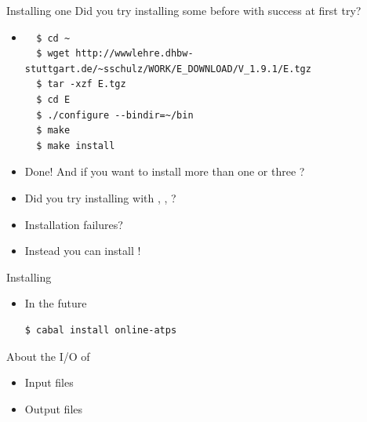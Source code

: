 \documentclass[newPxFont]{beamer}
\begin{document}
\begin{frame}[fragile]{Installing one \atp }
Did you try installing some \atp before with success at first try?\\
\begin{itemize}
\item {}
  \begin{lstlisting}
  $ cd ~
  $ wget http://wwwlehre.dhbw-stuttgart.de/~sschulz/WORK/E_DOWNLOAD/V_1.9.1/E.tgz
  $ tar -xzf E.tgz
  $ cd E
  $ ./configure --bindir=~/bin
  $ make
  $ make install
  \end{lstlisting}
\end{itemize}
\end{frame}

\begin{frame}
\begin{itemize}
\item Done! And if you want to install more than one or three \atps?\\
\item Did you try installing with \spass, \metis, \vampire?\\
\item Installation failures?
\item Instead you can install \onlineatps!
\end{itemize}
\end{frame}

\begin{frame}[fragile]{Installing \onlineatps}
\begin{itemize} \onlineatps
\begin{lstlisting}
$ git clone https://github.com/jonaprieto/online-atps
$ cd ~/online-atps
$ cabal install
\end{lstlisting}
\item In the future
\begin{lstlisting}
$ cabal install online-atps
\end{lstlisting}
\end{itemize}
\end{frame}

\begin{frame}

About the I/O of \atps
\begin{itemize}
\item Input files
\item Output files
\end{itemize}

\end{frame}
\end{document}
